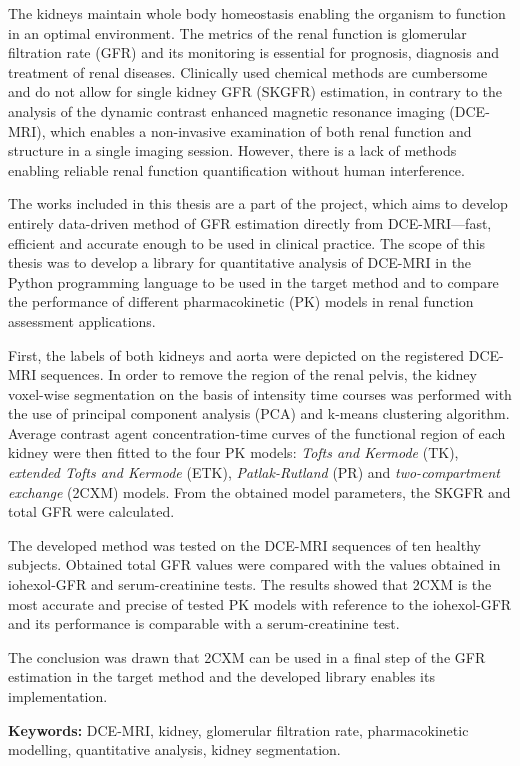 	\begin{spacing}{1.0}
		\begin{small}

The kidneys maintain whole body homeostasis enabling the organism to function in an optimal environment. The metrics of the renal function is glomerular filtration rate (GFR) and its monitoring is essential for prognosis, diagnosis and treatment of renal diseases. Clinically used chemical methods are cumbersome and do not allow for single kidney GFR (SKGFR) estimation,  in contrary to the analysis of the dynamic contrast enhanced magnetic resonance imaging  (DCE-MRI), which enables a non-invasive examination of both renal function and structure in a single imaging session. However, there is a lack of methods enabling reliable renal function quantification without human interference.

The works included in this thesis are a part of the project, which aims to develop entirely data-driven method of GFR estimation directly from DCE-MRI---fast, efficient and accurate enough to be used in clinical practice. 
The scope of this thesis was to develop a library for quantitative analysis of DCE-MRI in the Python programming language to be used in the target method and to compare the performance of different pharmacokinetic (PK) models in renal function assessment applications.

First, the labels of both kidneys and aorta were depicted on the registered DCE-MRI sequences. In order to remove the region of the renal pelvis, the kidney voxel-wise segmentation on the basis of intensity time courses was performed with the use of principal component analysis (PCA) and k-means clustering algorithm. Average contrast agent concentration-time curves of the functional region of each kidney were then fitted to the four PK models: \textit{Tofts and Kermode} (TK), \textit{extended Tofts and Kermode} (ETK), \textit{Patlak-Rutland} (PR) and \textit{two-compartment exchange} (2CXM) models. From the obtained model parameters, the SKGFR and total GFR were calculated.   

The developed method was tested on the DCE-MRI sequences of ten healthy subjects. Obtained total GFR values were compared with the values obtained in iohexol-GFR and serum-creatinine tests.
The results showed that 2CXM is the most accurate and precise of tested PK models with reference to the iohexol-GFR and its performance is comparable with a serum-creatinine test. 

The conclusion was drawn that 2CXM can be used in a final step of the GFR estimation in the target method and the developed library enables its implementation.   

		
		
		\end{small}

		
		\vfill
		\normalsize \noindent \textbf{Keywords:} DCE-MRI, kidney, glomerular filtration rate, pharmacokinetic modelling, quantitative analysis, kidney segmentation.  
				
				\end{spacing}	

	\newpage
\thispagestyle{empty}
\mbox{}	

